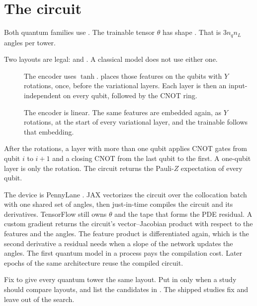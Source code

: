 \section{The circuit}
\label{sec:circuit}

Both quantum families use .
The trainable tensor \(\theta\) has shape .
That is \(3 n_{q} n_{L}\) angles per tower.

Two layouts are legal:  and .
A classical model does not use either one.

\begin{description}
\item[]
The encoder uses \(\tanh\).
 places those features on the qubits with \(Y\) rotations, once, before the variational layers.
Each layer is then an input-independent  on every qubit, followed by the CNOT ring.

\item[]
The encoder is linear.
The same features are embedded again, as \(Y\) rotations, at the start of every variational layer, and the trainable  follows that embedding.
\end{description}

After the rotations, a layer with more than one qubit applies CNOT gates from qubit \(i\) to \(i+1\) and a closing CNOT from the last qubit to the first.
A one-qubit layer is only the rotation.
The circuit returns the Pauli-\(Z\) expectation of every qubit.

The device is PennyLane .
JAX vectorizes the circuit over the collocation batch with one shared set of angles, then just-in-time compiles the circuit and its derivatives.
TensorFlow still owns \(\theta\) and the tape that forms the PDE residual.
A custom gradient returns the circuit's vector--Jacobian product with respect to the features and the angles.
The feature product is differentiated again, which is the second derivative a residual needs when a slope of the network updates the angles.
The first quantum model in a process pays the compilation cost.
Later epochs of the same architecture reuse the compiled circuit.

Fix  to give every quantum tower the same layout.
Put  in  only when a study should compare layouts, and list the candidates in .
The shipped studies fix  and leave  out of the search.

